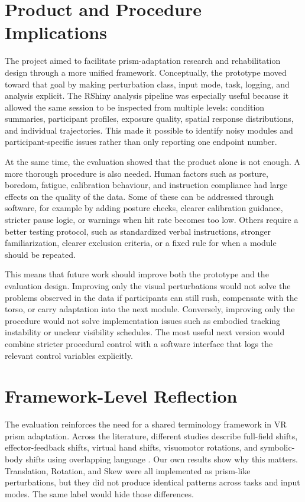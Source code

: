 \section{Product and Procedure Implications}
\label{sec:discussion-product-procedure}

The project aimed to facilitate prism-adaptation research and rehabilitation design through a more unified framework. Conceptually, the prototype moved toward that goal by making perturbation class, input mode, task, logging, and analysis explicit. The RShiny analysis pipeline was especially useful because it allowed the same session to be inspected from multiple levels: condition summaries, participant profiles, exposure quality, spatial response distributions, and individual trajectories. This made it possible to identify noisy modules and participant-specific issues rather than only reporting one endpoint number.

At the same time, the evaluation showed that the product alone is not enough. A more thorough procedure is also needed. Human factors such as posture, boredom, fatigue, calibration behaviour, and instruction compliance had large effects on the quality of the data. Some of these can be addressed through software, for example by adding posture checks, clearer calibration guidance, stricter pause logic, or warnings when hit rate becomes too low. Others require a better testing protocol, such as standardized verbal instructions, stronger familiarization, clearer exclusion criteria, or a fixed rule for when a module should be repeated.

This means that future work should improve both the prototype and the evaluation design. Improving only the visual perturbations would not solve the problems observed in the data if participants can still rush, compensate with the torso, or carry adaptation into the next module. Conversely, improving only the procedure would not solve implementation issues such as embodied tracking instability or unclear visibility schedules. The most useful next version would combine stricter procedural control with a software interface that logs the relevant control variables explicitly.

\section{Framework-Level Reflection}
\label{sec:discussion-framework-reflection}

The evaluation reinforces the need for a shared terminology framework in VR prism adaptation. Across the literature, different studies describe full-field shifts, effector-feedback shifts, virtual hand shifts, visuomotor rotations, and symbolic-body shifts using overlapping language \cite{Ramos2019,Gammeri2020,Bourgeois2021,cho2022feasibility,gerken2025sense}. Our own results show why this matters. Translation, Rotation, and Skew were all implemented as prism-like perturbations, but they did not produce identical patterns across tasks and input modes. The same label would hide those differences.

